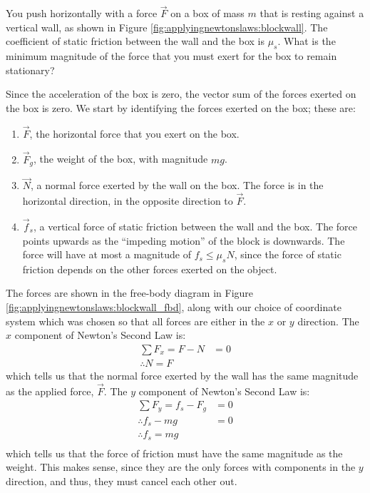 \begin{example}{You push horizontally with a force $\vec F$ on a box of mass $m$ that is resting against a vertical wall, as shown in Figure \ref{fig:applyingnewtonslaws:blockwall}. The coefficient of static friction between the wall and the box is $\mu_s$. What is the minimum magnitude of the force that you must exert for the box to remain stationary?}

Since the acceleration of the box is zero, the vector sum of the forces exerted on the box is zero. We start by identifying the forces exerted on the box; these are:
\begin{enumerate}
\item $\vec F$, the horizontal force that you exert on the box.
\item $\vec F_g$, the weight of the box, with magnitude $mg$.
\item $\vec N$, a normal force exerted by the wall on the box. The force is in the horizontal direction, in the opposite direction to $\vec F$.
\item $\vec f_s$, a vertical force of static friction between the wall and the box. The force points upwards as the ``impeding motion'' of the block is downwards. The force will have at most a magnitude of $f_s\leq\mu_s N$, since the force of static friction depends on the other forces exerted on the object.
\end{enumerate}
The forces are shown in the free-body diagram in Figure \ref{fig:applyingnewtonslaws:blockwall_fbd}, along with our choice of coordinate system which was chosen so that all forces are either in the $x$ or $y$ direction. 
The $x$ component of Newton's Second Law is:
\begin{align*}
\sum F_x = F - N &=0\\
\therefore N = F
\end{align*}
which tells us that the normal force exerted by the wall has the same magnitude as the applied force, $\vec F$. The $y$ component of Newton's Second Law is:
\begin{align*}
\sum F_y = f_s - F_g &=0\\
\therefore f_s -mg &=0\\
\therefore f_s = mg\\
\end{align*}
which tells us that the force of friction must have the same magnitude as the weight. This makes sense, since they are the only forces with components in the $y$ direction, and thus, they must cancel each other out. 


\end{example}

